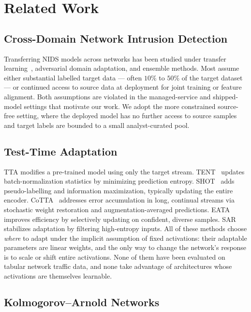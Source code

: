 \documentclass[10pt, conference, letterpaper]{IEEEtran}
\begin{document}
\section{Related Work}
\label{sec:related}

\subsection{Cross-Domain Network Intrusion Detection}

Transferring NIDS models across networks has been studied under transfer learning~\cite{li2021transfer, zhao2019cross}, adversarial domain adaptation, and ensemble methods. Most assume either substantial labelled target data --- often $10\%$ to $50\%$ of the target dataset --- or continued access to source data at deployment for joint training or feature alignment. Both assumptions are violated in the managed-service and shipped-model settings that motivate our work. We adopt the more constrained source-free setting, where the deployed model has no further access to source samples and target labels are bounded to a small analyst-curated pool.

\subsection{Test-Time Adaptation}

TTA modifies a pre-trained model using only the target stream. TENT~\cite{wang2021tent} updates batch-normalization statistics by minimizing prediction entropy. SHOT~\cite{liang2020shot} adds pseudo-labelling and information maximization, typically updating the entire encoder. CoTTA~\cite{wang2022cotta} addresses error accumulation in long, continual streams via stochastic weight restoration and augmentation-averaged predictions. EATA~\cite{niu2022efficient} improves efficiency by selectively updating on confident, diverse samples. SAR~\cite{niu2023sar} stabilizes adaptation by filtering high-entropy inputs. All of these methods choose \emph{where} to adapt under the implicit assumption of fixed activations: their adaptable parameters are linear weights, and the only way to change the network's response is to scale or shift entire activations. None of them have been evaluated on tabular network traffic data, and none take advantage of architectures whose activations are themselves learnable.

\subsection{Kolmogorov--Arnold Networks}
\end{document}
